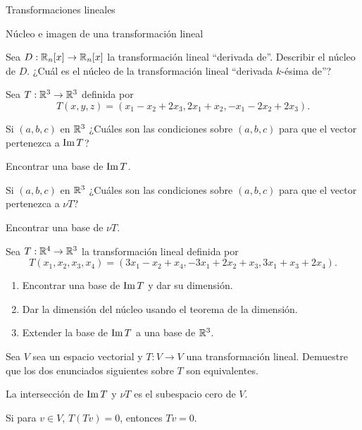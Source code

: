 \begin{chapter}{Transformaciones lineales}
\begin{section}{N\'ucleo e imagen de una transformaci\'on lineal}
\begin{enumex}
            \item Sea $D: \mathbb R_n[x] \to \mathbb R_n[x]$ la transformación lineal ``derivada de''. Describir el  núcleo de $D$. ¿Cuál es el núcleo de la transformación lineal ``derivada $k$-ésima de''? 
            \item Sea $T: \mathbb R^3 \to \mathbb R^3$  definida por
                $$
                    T(x,y,z) = (x_1-x_2 +2x_3,2x_1 + x_2, -x_1 -2x_2 + 2x_3). 
                $$
                \begin{enumex}
                    \item Si $(a,b,c)$  en $\mathbb R^3$ ¿Cuáles son las condiciones sobre $(a,b,c)$ para que el vector pertenezca a $\operatorname{Im} T$? 
                    \item Encontrar una base de $\operatorname{Im} T$. 
                    \item Si $(a,b,c)$  en $\mathbb R^3$ ¿Cuáles son las condiciones sobre $(a,b,c)$ para que el vector pertenezca a $\nu T$? 
                    \item Encontrar una base de $\nu T$. 
                \end{enumex}
                \item  Sea $T: \mathbb R^4 \to \mathbb R^3$ la transformación lineal  definida por
                $$ T(x_1,x_2,x_3,x_4)  =(3x_1-x_2+x_4,-3x_1 +2x_2+x_3, 3x_1+x_3+2x_4).$$
                \begin{enumerate}
                    \item Encontrar una base de $\operatorname{Im} T$ y dar su dimensión.
                    \item Dar la dimensión del núcleo usando el teorema de la dimensión.
                    \item Extender la base de $\operatorname{Im} T$  a una base de $\mathbb R^3$.
                \end{enumerate}
                
            \item Sea $V$ sea un espacio vectorial y $T: V \to V$ una transformación lineal. Demuestre que los dos enunciados siguientes sobre $T$ son equivalentes.
                \begin{enumex}
                    \item La intersección de $\operatorname{Im} T$ y $\nu T$  es el subespacio cero de $V$.
                    \item Si para $v \in V$, $T (Tv) = 0$, entonces $Tv = 0$.
                \end{enumex}
        \end{enumex}



\end{section}
\end{chapter}
